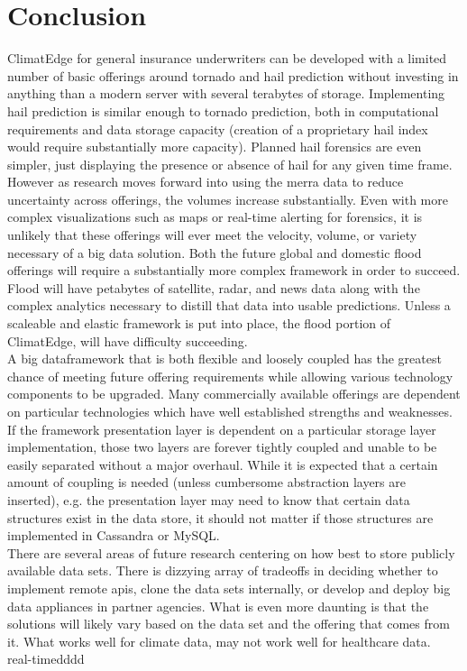 \section{Conclusion}
ClimatEdge\texttrademark{} for general insurance underwriters can be developed with a limited number of basic offerings around tornado and hail prediction without investing in anything than a modern server with several terabytes of storage. Implementing hail prediction is similar enough to tornado prediction, both in computational requirements and data storage capacity (creation of a proprietary hail index would require substantially more capacity). Planned hail forensics are even simpler, just displaying the presence or absence of hail for any given time frame. However as research moves forward into using the \gls{merra} data to reduce uncertainty across offerings, the volumes increase substantially. Even with more complex visualizations such as maps or real-time alerting for forensics, it is unlikely that these offerings will ever meet the velocity, volume, or variety necessary of a big data solution. Both the future global and domestic flood offerings will require a substantially more complex framework in order to succeed. Flood will have petabytes of satellite, radar, and news data along with the complex analytics necessary to distill that data into usable predictions. Unless a scaleable and elastic framework is put into place, the flood portion of ClimatEdge\texttrademark{}, will have difficulty succeeding.\\

A big dataframework that is both flexible and loosely coupled has the greatest chance of meeting future offering requirements while allowing various technology components to be upgraded. Many commercially available offerings are dependent on particular technologies which have well established strengths and weaknesses. If the framework presentation layer is dependent on a particular storage layer implementation, those two layers are forever tightly coupled and unable to be easily separated without a major overhaul. While it is expected that a certain amount of coupling is needed (unless cumbersome abstraction layers are inserted), e.g. the presentation layer may need to know that certain data structures exist in the data store, it should not matter if those structures are implemented in Cassandra or MySQL.\\

There are several areas of future research centering on how best to store publicly available data sets. There is dizzying array of tradeoffs in deciding whether to implement remote \gls{api}s, clone the data sets internally, or develop and deploy big data appliances in partner agencies. What is even more daunting is that the solutions will likely vary based on the data set and the offering that comes from it. What works well for climate data, may not work well for healthcare data.\\real-timedddd